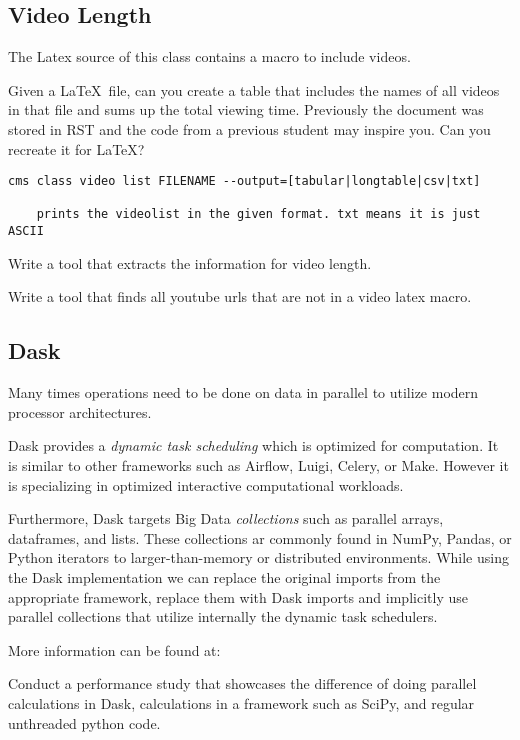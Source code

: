 \subsection{Video Length}

The Latex source of this class contains a macro to include videos.


Given a \LaTeX~file, can you create a table that includes the names of
all videos in that file and sums up the total viewing time. Previously
the document was stored in RST and the code from a previous student
may inspire you. Can you recreate it for \LaTeX? 



\begin{lstlisting}
cms class video list FILENAME --output=[tabular|longtable|csv|txt]

    prints the videolist in the given format. txt means it is just ASCII
\end{lstlisting}

\begin{comment}
The previous work even summarized the video length by chapter.

see: https://piazza.com/class/j5wll7vzylg25j?cid=325
\end{comment}

\begin{exercise}
Write a tool that extracts the information for video length. 
\end{exercise}

\begin{exercise}
Write a tool that finds all youtube urls that are not in a video latex
macro.
\end{exercise}

\subsection{Dask}

Many times operations need to be done on data in parallel to utilize
modern processor architectures.


Dask provides a \textit{dynamic task scheduling} which is optimized for
computation. It is similar to other frameworks such as Airflow, Luigi,
Celery, or Make. However it is specializing in optimized interactive
computational workloads.

Furthermore, Dask targets Big Data \textit{collections} such as parallel
arrays, dataframes, and lists. These collections ar commonly found in
NumPy, Pandas, or Python iterators to larger-than-memory or
distributed environments. While using the Dask implementation we can
replace the original imports from the appropriate framework, replace
them with Dask imports and implicitly use parallel collections that
utilize internally the dynamic task schedulers.

More information can be found at:


\begin{exercise}
Conduct a performance study that showcases the difference of doing
parallel calculations in Dask, calculations in a framework such as
SciPy, and regular unthreaded python code.
\end{exercise}

